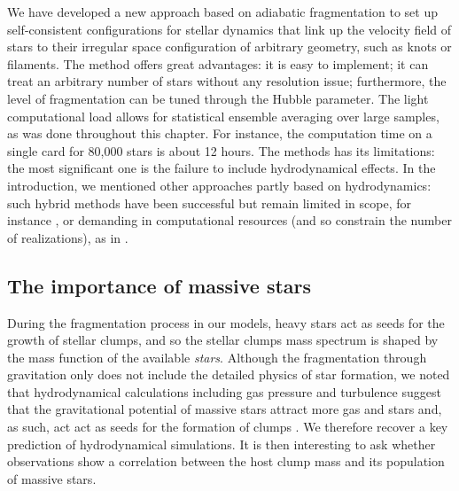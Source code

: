 We have developed a new approach based on adiabatic fragmentation to set up self-consistent configurations for stellar dynamics that link up the velocity field of stars to their irregular space configuration of arbitrary geometry, such as knots or filaments. The method offers great advantages: it is easy to implement; it can treat an arbitrary number of stars without any resolution issue; furthermore, the level of fragmentation can be tuned through the Hubble parameter. The light computational load allows for statistical ensemble averaging over large samples, as was done throughout this chapter. For instance, the computation time on a single card for 80,000 stars is about 12 hours. The methods has its limitations: the most significant one is the failure to include hydrodynamical effects. In the introduction, we mentioned other approaches partly based on hydrodynamics: such hybrid methods have been successful but remain limited in scope, for instance \cite{Moeckel2012}, or demanding in computational resources (and so constrain the number of realizations), as in \cite{Fujii2016}. 

\subsection*{The importance of massive stars}


During the fragmentation process in our models, heavy stars act as seeds for the growth of stellar clumps, and so the stellar clumps mass spectrum is shaped by the mass function of the available {\it stars}. Although the fragmentation through gravitation only does not include the detailed physics of star formation, we noted that hydrodynamical calculations including gas pressure and turbulence suggest that the gravitational potential of massive stars attract more gas and stars and, as such, act act as seeds for the formation of clumps \citep{Bonnell2004}. We therefore recover a key prediction of hydrodynamical simulations. It is then interesting to ask whether observations show a correlation between the host clump mass and its population of massive stars.

